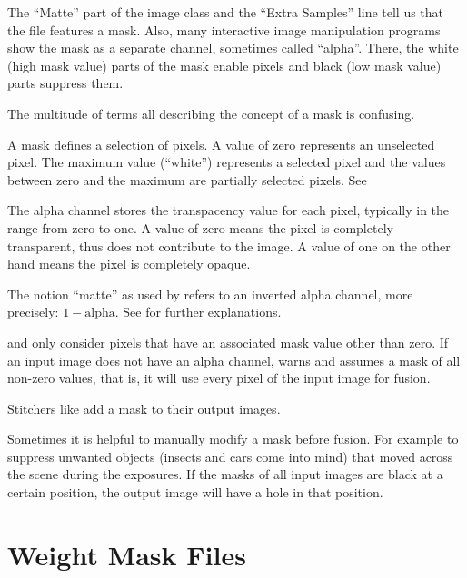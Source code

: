 %
%
%
The ``Matte'' part of the image class and the ``Extra Samples'' line tell us that the file
features a mask.  Also, many interactive image manipulation programs show the mask as a separate
channel, sometimes called ``alpha''.  There, the white (high mask value) parts of the mask
enable pixels and black (low mask value) parts suppress them.

The multitude of terms all describing the concept of a mask is confusing.

\begin{description}
\item[Mask]\itemend
  A mask defines a selection of pixels.  A value of zero represents an unselected pixel.  The
  maximum value (``white'') represents a selected pixel and the values between zero and the
  maximum are partially selected pixels.  See 

\item[Alpha Channel]\itemend
  The alpha channel stores the transpacency value for each pixel, typically in the range from
  zero to one.  A value of zero means the pixel is completely transparent, thus does not
  contribute to the image.  A value of one on the other hand means the pixel is completely
  opaque.

\item[Matte]\itemend
  The notion ``matte'' as used by  refers to an inverted alpha channel,
  more precisely: $1 - \mbox{alpha}$.  See
   for further explanations.
\end{description}

 and  only consider pixels that have an associated mask
value other than zero.  If an input image does not have an alpha channel, 
warns and assumes a mask of all non-zero values, that is, it will use every pixel of the input
image for fusion.

Stitchers like  add a mask to their output images.

Sometimes it is helpful to manually modify a mask before fusion.  For example to suppress
unwanted objects (insects and cars come into mind) that moved across the scene during the
exposures.  If the masks of all input images are black at a certain position, the output image
will have a hole in that position.


\section[Weight Mask Files]{\label{sec:weight-mask-files}%
  Weight Mask Files}




